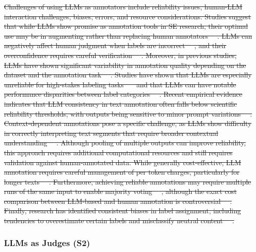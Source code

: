\documentclass[smallextended]{svjour3}
\newcommand{\studytypesubsection}[1]{\subsubsection{#1}}
\newcommand{\studytypeparagraph}[1]{\paragraph{\bfseries #1:}}
\providecommand{\DIFdeltex}[1]{{\protect\color{red}\sout{#1}}}                      %
\providecommand{\DIFaddbegin}{} %
\providecommand{\DIFaddend}{} %
\providecommand{\DIFdelend}{} %
\providecommand{\DIFdel}[1]{\texorpdfstring{\DIFdeltex{#1}}{}} %
\newcommand{\DIFaddincludegraphics}[2][]{{\color{blue}\fbox{\DIFOincludegraphics[#1]{#2}}}} %
\DeclareRobustCommand{\DIFaddbegin}{\DIFOaddbegin \let\includegraphics\DIFaddincludegraphics} %
\DeclareRobustCommand{\DIFaddend}{\DIFOaddend \let\includegraphics\DIFOincludegraphics} %
\DeclareRobustCommand{\DIFdelend}{\DIFOaddend \let\includegraphics\DIFOincludegraphics} %
\begin{document}
\DIFdel{Challenges of using LLMs as annotators include reliability issues, human-LLM interaction challenges, biases, errors, and resource considerations.
Studies suggest that while LLMs show promise as annotation tools in SE research, their optimal use may be in augmenting rather than replacing human annotators~\mbox{%
\cite{DBLP:conf/emnlp/WangLXZZ21, DBLP:conf/chi/HeHDRH24}}\hskip0pt%
.
LLMs can negatively affect human judgment when labels are incorrect~\mbox{%
\cite{DBLP:conf/www/HuangKA23a}}\hskip0pt%
, and their overconfidence requires careful verification~\mbox{%
\cite{DBLP:conf/kdd/WanSJKCNSSWYABJ24}}\hskip0pt%
.
Moreover, in previous studies, LLMs have shown significant variability in annotation quality depending on the dataset and the annotation task~\mbox{%
\cite{DBLP:journals/corr/abs-2306-00176}}\hskip0pt%
.
Studies have shown that LLMs are especially unreliable for high-stakes labeling tasks~\mbox{%
\cite{DBLP:conf/chi/Wang0RMM24} }\hskip0pt%
and that LLMs can have notable performance disparities between label categories~\mbox{%
\cite{DBLP:journals/corr/abs-2304-10145}}\hskip0pt%
.
Recent empirical evidence indicates that LLM consistency in text annotation often falls below scientific reliability thresholds, with outputs being sensitive to minor prompt variations~\mbox{%
\cite{DBLP:journals/corr/abs-2304-11085}}\hskip0pt%
.
Context-dependent annotations pose a specific challenge, as LLMs show difficulty in correctly interpreting text segments that require broader contextual understanding~\mbox{%
\cite{DBLP:conf/chi/HeHDRH24}}\hskip0pt%
.
Although pooling of multiple outputs can improve reliability, this approach requires additional computational resources and still requires validation against human-annotated data.
While generally cost-effective, LLM annotation requires careful management of per token charges, particularly for longer texts~\mbox{%
\cite{DBLP:conf/emnlp/WangLXZZ21}}\hskip0pt%
. Furthermore, achieving reliable annotations may require multiple runs of the same input to enable majority voting~\mbox{%
\cite{DBLP:journals/corr/abs-2304-11085}}\hskip0pt%
, although the exact cost comparison between LLM-based and human annotation is controversial~\mbox{%
\cite{DBLP:conf/chi/HeHDRH24}}\hskip0pt%
.
Finally, research has identified consistent biases in label assignment, including tendencies to overestimate certain labels and misclassify neutral content~\mbox{%
\cite{DBLP:journals/corr/abs-2304-10145}}\hskip0pt%
. 
}%
\DIFdelend \DIFaddbegin \studytypesubsection{LLMs as Judges (S2)}
\DIFaddend \label{sec:llms-as-judges}
\end{document}
